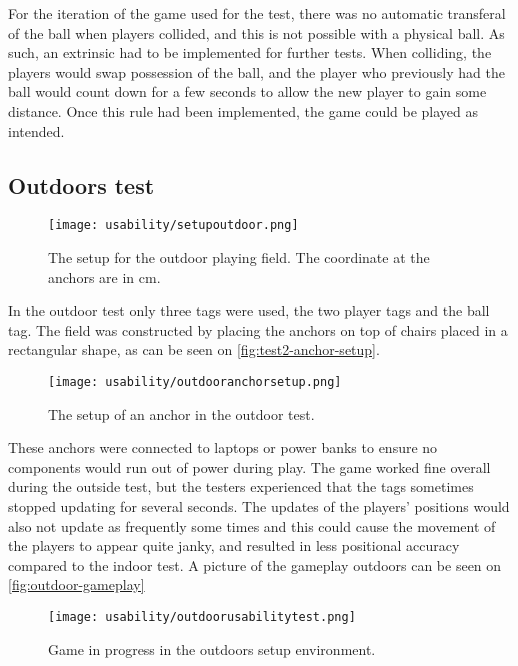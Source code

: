 For the iteration of the game used for the test, there was no automatic transferal of the ball when players collided, and this is not possible with a physical ball.
As such, an extrinsic had to be implemented for further tests.
When colliding, the players would swap possession of the ball, and the player who previously had the ball would count down for a few seconds to allow the new player to gain some distance.
Once this rule had been implemented, the game could be played as intended.

\subsection{Outdoors test}
\begin{figure}[H]
    \centering
    \texttt{[image: usability/setupoutdoor.png]}
    \caption{The setup for the outdoor playing field. The coordinate at the anchors are in cm.}
    \label{fig:test2-outdoor-setup}
\end{figure}
\noindent
In the outdoor test only three tags were used, the two player tags and the ball tag.
The field was constructed by placing the anchors on top of chairs placed in a rectangular shape, as can be seen on \autoref{fig:test2-anchor-setup}.

\begin{figure}[H]
    \centering
    \texttt{[image: usability/outdooranchorsetup.png]}
    \caption{The setup of an anchor in the outdoor test.}
    \label{fig:test2-anchor-setup}
\end{figure}
\noindent
These anchors were connected to laptops or power banks to ensure no components would run out of power during play.
The game worked fine overall during the outside test, but the testers experienced that the tags sometimes stopped updating for several seconds.
The updates of the players' positions would also not update as frequently some times and this could cause the movement of the players to appear quite janky, and resulted in less positional accuracy compared to the indoor test.
A picture of the gameplay outdoors can be seen on \autoref{fig:outdoor-gameplay}
\begin{figure}[H]
    \centering
    \texttt{[image: usability/outdoorusabilitytest.png]}
    \caption{Game in progress in the outdoors setup environment.}
    \label{fig:outdoor-gameplay}
\end{figure}

